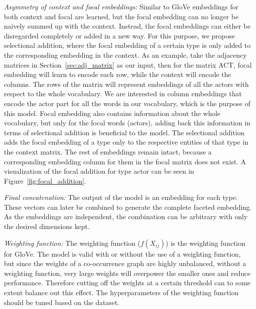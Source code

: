 \begin{compactitem}
\item \emph{Asymmetry of context and focal embeddings:} Similar to GloVe embeddings for both context and focal are learned, but the focal embedding can no longer be naively summed up with the context. Instead, the focal embeddings can either be disregarded completely or added in a new way. For this purpose, we propose selectional addition, where the focal embedding of a certain type is only added to the corresponding embedding in the context. As an example, take the adjacency matrices in Section~\ref{sec:adj_matrix} as our input, then for the matrix ACT,  focal embedding will learn to encode each row, while the context will encode the columns. The rows of the matrix will represent embeddings of all the actors with respect to the whole vocabulary. We are interested in column embeddings that encode the actor part for all the words in our vocabulary, which is the purpose of this model. Focal embedding also contains information about the whole vocabulary, but only for the focal words (actors), adding back this information in terms of selectional addition is beneficial to the model. The selectional addition adds the focal embedding of a type only to the respective entities of that type in the context matrix. The rest of embeddings remain intact, because a corresponding embedding column for them in the focal matrix does not exist. A visualization of the focal addition for type actor can be seen in Figure~\ref{fig:focal_addition}.\\

\item \emph{Final concatenation:} The output of the model is an embedding for each type. These vectors can later be combined to generate the complete faceted embedding. As the embeddings are independent, the combination can be arbitrary with only the desired dimensions kept. \\

\item \emph{Weighting function:} The weighting function ($f(X_{ij})$) is the weighting function for GloVe. The model is valid with or without the use of a weighting function, but since the weights of a co-occurrence graph are highly unbalanced, without a weighting function, very large weights will overpower the smaller ones and reduce performance. Therefore cutting off the weights at a certain threshold can to some extent balance out this effect. The hyperparameters of the weighting function should be tuned based on the dataset.\\


\end{compactitem}
